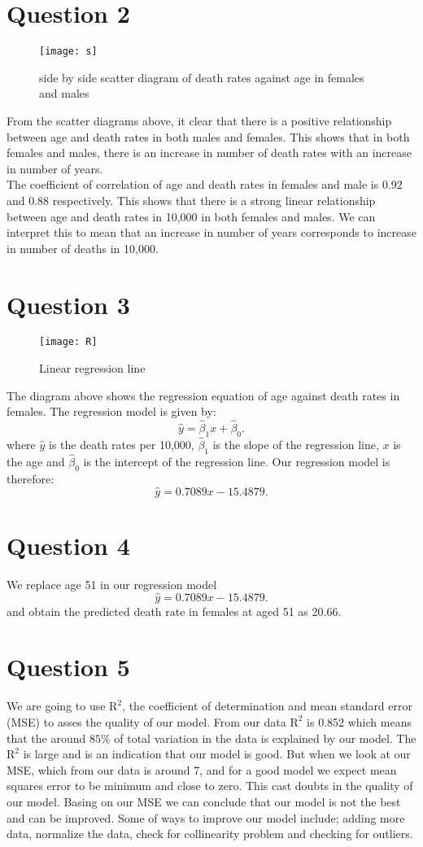 \documentclass[12pt,a4paper]{article}
\begin{document}
\section*{Question 2}
\begin{figure}[H]
\texttt{[image: s]}
\centering
\caption{side by side scatter diagram of death rates against age in females and males}
\end{figure}
From the scatter diagrams above, it clear that there is a positive relationship between age and death rates in both males and females. This shows that in both females and males, there is an increase in number of death rates with an increase in number of years.\\
The coefficient of correlation of age and death rates in females and male is 0.92 and 0.88 respectively. This shows that there is a strong linear relationship between age and death rates in 10,000 in both females and males. We can interpret this to mean that an increase in number of years corresponds to increase in number of deaths in 10,000.
\section*{Question 3}
\begin{figure}[H]
\texttt{[image: R]}
\centering
\caption{Linear regression line}
\end{figure}
The diagram above shows the regression equation of age against death rates in females. The regression model is given by:\\
$$ \hat{y}=\hat{\beta}_1x+\hat{\beta}_0.$$
where $\hat{y}$ is the death rates per 10,000, $\hat{\beta}_1$ is the slope of the regression line, $x$ is the age and  $\hat{\beta}_0$ is the intercept of the regression line. Our regression model is therefore: $$ \hat{y}=0.7089x-15.4879.$$
\section*{Question 4}
We replace age 51 in our regression model$$ \hat{y}=0.7089x-15.4879.$$ and obtain the predicted death rate in females at aged 51 as 20.66. 
\section*{Question 5}
We are going to use $\mathrm{R^2}$, the coefficient of determination and mean standard error (MSE) to asses the quality of our model.
From our data  $\mathrm{R^2}$ is 0.852 which means that the around $85 \%$ of total variation in the data is explained by our model. The $\mathrm{R^2}$ is large and is an indication that our model is good. But when we look at our MSE, which from our data is around 7, and for a good model we expect mean squares error to be minimum and close to zero. This cast doubts in the quality of our model. Basing on our MSE we can conclude that our model is not the best and can be improved. Some of ways to improve our model include; adding more data, normalize the data, check for collinearity problem and checking for outliers. 
\end{document}
